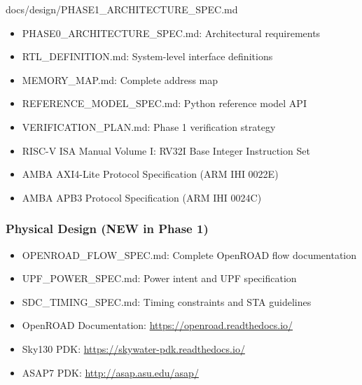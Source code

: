 \begin{relocated}{docs/design/PHASE1_ARCHITECTURE_SPEC.md}
\begin{itemize}
\tightlist
\item
  PHASE0\_\allowbreak{}ARCHITECTURE\_\allowbreak{}SPEC.md: Architectural
  requirements
\item
  RTL\_\allowbreak{}DEFINITION.md: System-level interface definitions
\item
  MEMORY\_\allowbreak{}MAP.md: Complete address map
\item
  REFERENCE\_\allowbreak{}MODEL\_\allowbreak{}SPEC.md: Python reference
  model API
\item
  VERIFICATION\_\allowbreak{}PLAN.md: Phase 1 verification strategy
\item
  RISC-V ISA Manual Volume I: RV32I Base Integer Instruction Set
\item
  AMBA AXI4-Lite Protocol Specification (ARM IHI 0022E)
\item
  AMBA APB3 Protocol Specification (ARM IHI 0024C)
\end{itemize}

\subsubsection{Physical Design (NEW in Phase 1)}\label{ds:ch:phase1-architecture:physical-design-new-in-phase-1}

\begin{itemize}
\tightlist
\item
  OPENROAD\_\allowbreak{}FLOW\_\allowbreak{}SPEC.md: Complete OpenROAD
  flow documentation
\item
  UPF\_\allowbreak{}POWER\_\allowbreak{}SPEC.md: Power intent and UPF
  specification
\item
  SDC\_\allowbreak{}TIMING\_\allowbreak{}SPEC.md: Timing constraints and
  STA guidelines
\item
  OpenROAD Documentation:
  \href{https://openroad.readthedocs.io/}{https:/\allowbreak{}/\allowbreak{}openroad.readthedocs.io/}
\item
  Sky130 PDK:
  \href{https://skywater-pdk.readthedocs.io/}{https:/\allowbreak{}/\allowbreak{}skywater-pdk.readthedocs.io/}
\item
  ASAP7 PDK:
  \href{http://asap.asu.edu/asap/}{http:/\allowbreak{}/\allowbreak{}asap.asu.edu/\allowbreak{}asap/}
\end{itemize}
\end{relocated}

